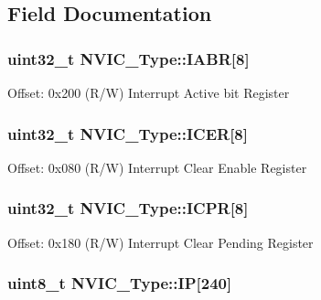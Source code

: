 \subsection{Field Documentation}
\hypertarget{structNVIC__Type_a33e917b381e08dabe4aa5eb2881a7c11}{
\subsubsection[{I\-A\-B\-R}]{ uint32\-\_\-t N\-V\-I\-C\-\_\-\-Type\-::\-I\-A\-B\-R\mbox{[}8\mbox{]}}}\label{structNVIC__Type_a33e917b381e08dabe4aa5eb2881a7c11}
Offset\-: 0x200 (R/\-W) Interrupt Active bit Register \hypertarget{structNVIC__Type_a1965a2e68b61d2e2009621f6949211a5}{
\subsubsection[{I\-C\-E\-R}]{ uint32\-\_\-t N\-V\-I\-C\-\_\-\-Type\-::\-I\-C\-E\-R\mbox{[}8\mbox{]}}}\label{structNVIC__Type_a1965a2e68b61d2e2009621f6949211a5}
Offset\-: 0x080 (R/\-W) Interrupt Clear Enable Register \hypertarget{structNVIC__Type_a46241be64208436d35c9a4f8552575c5}{
\subsubsection[{I\-C\-P\-R}]{ uint32\-\_\-t N\-V\-I\-C\-\_\-\-Type\-::\-I\-C\-P\-R\mbox{[}8\mbox{]}}}\label{structNVIC__Type_a46241be64208436d35c9a4f8552575c5}
Offset\-: 0x180 (R/\-W) Interrupt Clear Pending Register \hypertarget{structNVIC__Type_a6524789fedb94623822c3e0a47f3d06c}{
\subsubsection[{I\-P}]{ uint8\-\_\-t N\-V\-I\-C\-\_\-\-Type\-::\-I\-P\mbox{[}240\mbox{]}}}\label{structNVIC__Type_a6524789fedb94623822c3e0a47f3d06c}
